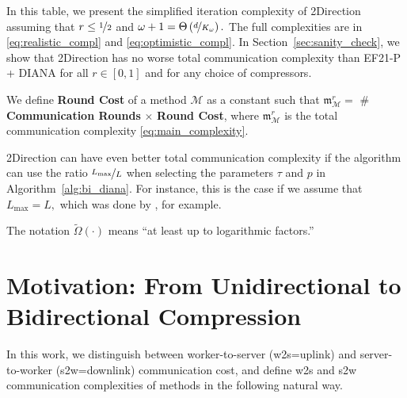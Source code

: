 \documentclass{article} %
\newcommand{\cM}{\mathcal{M}}
\theoremstyle{plain}
\theoremstyle{definition}
\theoremstyle{remark}
\newcommand{\green}{\color{mydarkgreen}}
\newcommand{\algnamesmall}[1]{{\scriptsize\green\sf #1}}
\begin{document}
\begin{table}
\begin{threeparttable}
\begin{tablenotes}
      \item [{\color{blue}(b)}] In this table, we present the simplified iteration complexity of \algnamesmall{2Direction} assuming that $r \leq \nicefrac{1}{2}$ and $\omega + 1 = \Theta\left(\nicefrac{d}{K_{\omega}}\right).$ The full complexities are in \eqref{eq:realistic_compl} and \eqref{eq:optimistic_compl}. In Section~\ref{sec:sanity_check}, we show that \algnamesmall{2Direction} has no worse total communication complexity than \algnamesmall{EF21-P + DIANA} for all $r \in [0, 1]$ and for any choice of compressors.
      \item [{\color{blue}(c)}] We define {\bf Round Cost} of a method $\cM$ as a constant such that $\mathfrak{m}^{r}_{{\scriptscriptstyle \cM}} = $ \# {\bf Communication Rounds} $ \times $ {\bf Round Cost}, where $\mathfrak{m}^{r}_{{\scriptscriptstyle \cM}}$ is the total communication complexity \eqref{eq:main_complexity}.
      \item [{\color{blue}(d)}] \algnamesmall{2Direction} can have even better total communication complexity if the algorithm can use the ratio $\nicefrac{L_{\max}}{L}$ when selecting the parameters $\tau$ and $p$ in Algorithm~\ref{alg:bi_diana}. For instance, this is the case if we assume that  $L_{\max} = L, $ which was done by \citet{ADIANA, li2021canita}, for example.
      \item [{\color{blue}(f)}] The notation $\widetilde{\Omega}\left(\cdot\right)$ means ``at least up to logarithmic factors.''
    \end{tablenotes}
\end{threeparttable}      
\end{table}



\section{Motivation: From Unidirectional to Bidirectional Compression} \label{sec:current}

In this work, we  distinguish between  worker-to-server (w2s=uplink) and  server-to-worker (s2w=downlink) communication cost, and define w2s and s2w communication complexities of methods in the following natural way.
\end{document}
